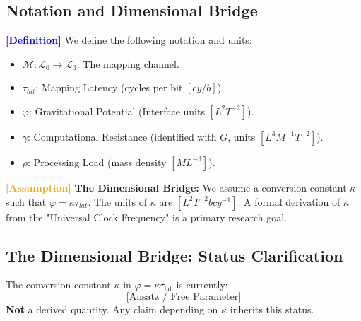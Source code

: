 \documentclass[11pt,titlepage]{article}
\newcommand{\substrate}{\mathcal{L}_0}
\newcommand{\interface}{\mathcal{L}_3}
\newcommand{\tagdef}{\textcolor{blue}{\textbf{[Definition]}} }
\newcommand{\tagass}{\textcolor{orange}{\textbf{[Assumption]}} }
\begin{document}
\subsection{Notation and Dimensional Bridge}
\tagdef We define the following notation and units:
\begin{itemize}
    
\item $\mathcal{M}: \substrate \to \interface$: The mapping channel.
    
\item $\tau_{lat}$: Mapping Latency (cycles per bit $[cy/b]$).
    
\item $\varphi$: Gravitational Potential (Interface units $[L^2 T^{-2}]$).
    
\item $\gamma$: Computational Resistance (identified with $G$, units $[L^3 M^{-1} T^{-2}]$).
    
\item $\rho$: Processing Load (mass density $[M L^{-3}]$).
\end{itemize}

\tagass \textbf{The Dimensional Bridge:} We assume a conversion constant $\kappa$ such that $\varphi = \kappa \tau_{lat}$. The units of $\kappa$ are $[L^2 T^{-2} b cy^{-1}]$. A formal derivation of $\kappa$ from the "Universal Clock Frequency" is a primary research goal.




\subsection{The Dimensional Bridge: Status Clarification}
\label{sec:units-bridge-status}

\begin{tcolorbox}[colback=red!5!white,colframe=red!75!black,title=Critical Status Update]
The conversion constant $\kappa$ in $\varphi = \kappa \tau_{\mathrm{lat}}$ is currently:
\[
\boxed{\text{[Ansatz / Free Parameter]}}
\]
\textbf{Not} a derived quantity. Any claim depending on $\kappa$ inherits this status.
\end{tcolorbox}
\end{document}

